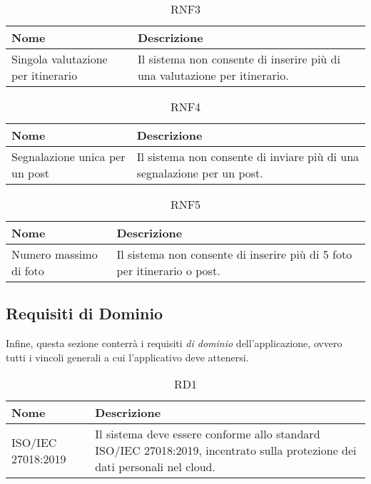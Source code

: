 \documentclass{natourDoc}
\begin{document}
	\begin{table}[H]
		\centering
		\begin{tabular}{ |p{5cm}|p{10.3cm}| } 
			\hline
			\rowcolor{PineGreen!70}
			\textbf{Nome} & \textbf{Descrizione} \\
			\hline
			Singola valutazione per itinerario & Il sistema non consente di inserire più di una valutazione
			per itinerario. \\
			\hline
		\end{tabular}
		\caption{RNF3}
		\label{table:23}
	\end{table}

	\begin{table}[H]
		\centering
		\begin{tabular}{ |p{5cm}|p{10.3cm}| } 
			\hline
			\rowcolor{PineGreen!70}
			\textbf{Nome} & \textbf{Descrizione} \\
			\hline
			Segnalazione unica per un post & Il sistema non consente di inviare più di una segnalazione per un post. \\
			\hline
		\end{tabular}
		\caption{RNF4}
		\label{table:24}
	\end{table}

	\begin{table}[H]
		\centering
		\begin{tabular}{ |p{5cm}|p{10.3cm}| } 
			\hline
			\rowcolor{PineGreen!70}
			\textbf{Nome} & \textbf{Descrizione} \\
			\hline
			Numero massimo di foto & Il sistema non consente di inserire più di 5 foto per itinerario o post. \\
			\hline
		\end{tabular}
		\caption{RNF5}
		\label{table:25}
	\end{table}

	\newpage

	\subsection{Requisiti di Dominio}
	Infine, questa sezione conterrà i requisiti \textit{di dominio} dell'applicazione, ovvero tutti i vincoli generali a cui l'applicativo
	deve attenersi. \\

	\begin{table}[H]
		\centering
		\begin{tabular}{ |p{5cm}|p{10.3cm}| }
			\hline
			\rowcolor{PineGreen!70}
			\textbf{Nome} & \textbf{Descrizione} \\
			\hline
			ISO/IEC 27018:2019 & Il sistema deve essere conforme allo standard ISO/IEC 27018:2019, 
			incentrato sulla protezione dei dati personali nel cloud. \\
			\hline
		\end{tabular}
		\caption{RD1}
		\label{table:26}
	\end{table}
\end{document}
